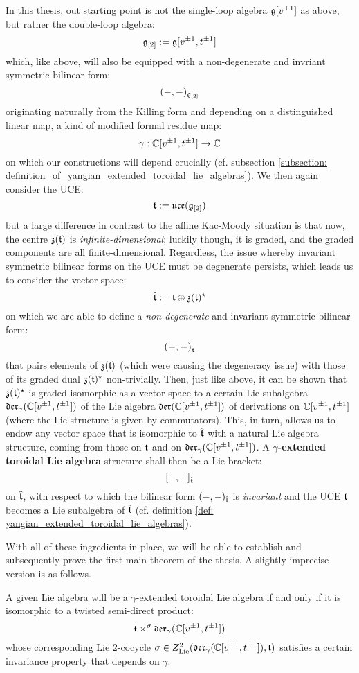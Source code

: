         In this thesis, out starting point is not the single-loop algebra $\mathfrak{g}[v^{\pm 1}]$ as above, but rather the double-loop algebra:
            $$\mathfrak{g}_{[2]} := \mathfrak{g}[v^{\pm 1}, t^{\pm 1}]$$
        which, like above, will also be equipped with a non-degenerate and invriant symmetric bilinear form:
            $$(-, -)_{\mathfrak{g}_{[2]}}$$
        originating naturally from the Killing form and depending on a distinguished linear map, a kind of modified formal residue map:
            $$\gamma: \mathbb{C}[v^{\pm 1}, t^{\pm 1}] \to \mathbb{C}$$
        on which our constructions will depend crucially (cf. subsection \ref{subsection: definition_of_yangian_extended_toroidal_lie_algebras}). We then again consider the UCE:
            $$\mathfrak{t} := \mathfrak{uce}(\mathfrak{g}_{[2]})$$
        but a large difference in contrast to the affine Kac-Moody situation is that now, the centre $\mathfrak{z}(\mathfrak{t})$ is \textit{infinite-dimensional}; luckily though, it is graded, and the graded components are all finite-dimensional. Regardless, the issue whereby invariant symmetric bilinear forms on the UCE must be degenerate persists, which leads us to consider the vector space:
            $$\hat{\mathfrak{t}} := \mathfrak{t} \oplus \mathfrak{z}(\mathfrak{t})^{\star}$$
        on which we are able to define a \textit{non-degenerate} and invariant symmetric bilinear form:
            $$(-, -)_{\hat{\mathfrak{t}}}$$
        that pairs elements of $\mathfrak{z}(\mathfrak{t})$ (which were causing the degeneracy issue) with those of its graded dual $\mathfrak{z}(\mathfrak{t})^{\star}$ non-trivially. Then, just like above, it can be shown that $\mathfrak{z}(\mathfrak{t})^{\star}$ is graded-isomorphic as a vector space to a certain Lie subalgebra $\mathfrak{der}_{\gamma}(\mathbb{C}[v^{\pm 1}, t^{\pm 1}])$ of the Lie algebra $\mathfrak{der}(\mathbb{C}[v^{\pm 1}, t^{\pm 1}])$ of derivations on $\mathbb{C}[v^{\pm 1}, t^{\pm 1}]$ (where the Lie structure is given by commutators). This, in turn, allows us to endow any vector space that is isomorphic to $\hat{\mathfrak{t}}$ with a natural Lie algebra structure, coming from those on $\mathfrak{t}$ and on $\mathfrak{der}_{\gamma}(\mathbb{C}[v^{\pm 1}, t^{\pm 1}])$. A \textbf{$\gamma$-extended toroidal Lie algebra} structure shall then be a Lie bracket:
            $$[-, -]_{\hat{\mathfrak{t}}}$$
        on $\hat{\mathfrak{t}}$, with respect to which the bilinear form $(-, -)_{\hat{\mathfrak{t}}}$ is \textit{invariant} and the UCE $\mathfrak{t}$ becomes a Lie subalgebra of $\hat{\mathfrak{t}}$ (cf. definition \ref{def: yangian_extended_toroidal_lie_algebras}).
        
        With all of these ingredients in place, we will be able to establish and subsequently prove the first main theorem of the thesis. A slightly imprecise version is as follows.
        \begin{theorem}
            A given Lie algebra will be a $\gamma$-extended toroidal Lie algebra if and only if it is isomorphic to a twisted semi-direct product:
                $$\mathfrak{t} \rtimes^{\sigma} \mathfrak{der}_{\gamma}(\mathbb{C}[v^{\pm 1}, t^{\pm 1}])$$
            whose corresponding Lie $2$-cocycle $\sigma \in Z^2_{\mathrm{Lie}}(\mathfrak{der}_{\gamma}(\mathbb{C}[v^{\pm 1}, t^{\pm 1}]), \mathfrak{t})$ satisfies a certain invariance property that depends on $\gamma$.
        \end{theorem}

